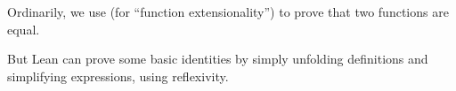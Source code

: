\documentclass[letterpaper,10pt,english]{sphinxmanual}
\begin{document}
\begin{sphinxVerbatim}[commandchars=\\\{\}]
     

                
     

   

       
\end{sphinxVerbatim}

\sphinxAtStartPar
Ordinarily, we use  (for “function extensionality”) to prove that two functions are equal.

\begin{sphinxVerbatim}[commandchars=\\\{\}]
                    
 
\end{sphinxVerbatim}

\sphinxAtStartPar
But Lean can prove some basic identities by simply unfolding definitions and simplifying expressions, using reflexivity.
\end{document}

